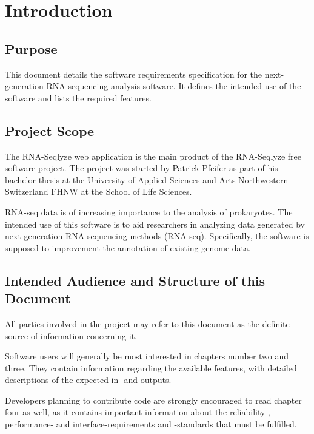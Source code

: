 \documentclass[a4paper]{srs}
\begin{document}

\tableofcontents
\newpage

	\section{Introduction}
\subsection{Purpose}
This document details the software requirements specification for the 
 next-generation RNA-sequencing analysis software. It 
defines the intended use of the software and lists the required features.

\subsection{Project Scope}
The RNA-Seqlyze web application is the main product of the RNA-Seqlyze free 
software project. The project was started by Patrick Pfeifer as part of his 
bachelor thesis at the University of Applied Sciences and Arts Northwestern 
Switzerland FHNW at the School of Life Sciences.

RNA-seq data is of increasing importance to the analysis of prokaryotes. The 
intended use of this software is to aid researchers in analyzing data generated 
by next-generation RNA sequencing methods (RNA-seq). Specifically, the software 
is supposed to improvement the annotation of existing genome data.

\subsection{Intended Audience and Structure of this Document}
All parties involved in the project may refer to this document as the definite
source of information concerning it.

Software users will generally be most interested in chapters number two and 
three. They contain information regarding the available features, with detailed
descriptions of the expected in- and outputs.

Developers planning to contribute code are strongly encouraged to read chapter
four as well, as it contains important information about the reliability-,
performance- and interface-requirements and -standards that must be fulfilled.

\end{document}
